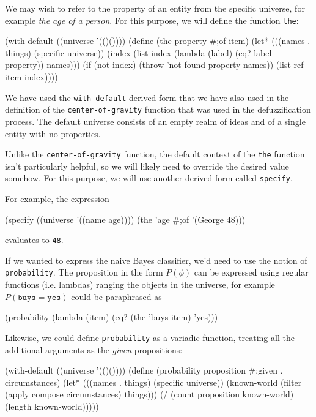 We may wish to refer to the property of an entity
from the specific universe, for example \textit{the age
of a person}. For this purpose, we will define the
function \texttt{the}:

\begin{Snippet}
(with-default ((universe '(()())))
  (define (the property #;of item)
    (let* (((names . things) (specific universe))
	   (index (list-index (lambda (label) 
                                (eq? label property)) 
                              names)))
      (if (not index)
	  (throw 'not-found property names))
      (list-ref item index))))
\end{Snippet}

We have used the \texttt{with-default} derived form
that we have also used in the definition of the
\texttt{center\--of\--gravity} function that was used
in the defuzzification process. The default universe
consists of an empty realm of ideas and of a single
entity with no properties.

Unlike the \texttt{center\--of\--gravity} function,
the default context of the \texttt{the} function isn't
particularly helpful, so we will likely need to
override the desired value somehow. For this purpose,
we will use another derived form called \texttt{specify}.

For example, the expression
\begin{Snippet}
(specify ((universe '((name age))))
  (the 'age #;of '(George 48)))
\end{Snippet}
evaluates to \texttt{48}.

If we wanted to express the naive Bayes classifier,
we'd need to use the notion of \texttt{probability}.
The proposition in the form $P(\phi)$ can be expressed
using regular functions (i.e. lambdas) ranging the
objects in the universe, for example
$P(\mathtt{buys}=\mathtt{yes})$ could be paraphrased as
\begin{Snippet}
(probability 
  (lambda (item) 
    (eq? (the 'buys item) 'yes)))
\end{Snippet}

Likewise, we could define \texttt{probability} as
a variadic function, treating all the additional
arguments as the \textit{given} propositions:

\begin{Snippet}
(with-default ((universe '(()())))
  (define (probability proposition #;given . circumstances)
    (let* (((names . things) (specific universe))
	   (known-world (filter (apply compose circumstances) 
				things)))
      (/ (count proposition known-world)
	 (length known-world)))))
\end{Snippet}

